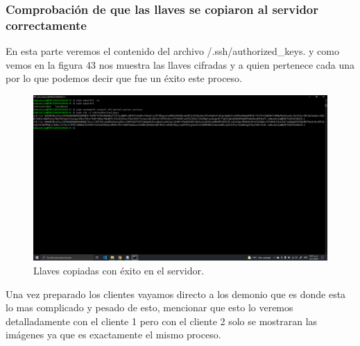 \documentclass[11pt]{article}
\begin{document}
		\subsubsection{Comprobación de que las llaves se copiaron al servidor correctamente }
		En esta parte veremos el contenido del archivo  /.ssh/authorized\_keys. y como vemos en la figura 43 nos muestra las llaves cifradas y a quien pertenece cada una por lo que podemos decir que fue un éxito este proceso.
		\begin{figure}[H]
			\centering
			\includegraphics[scale=0.34]{resources/llavesok.png}
			\caption{Llaves copiadas con éxito en el servidor.}\label{fig:picture}
		\end{figure}
		Una vez preparado los clientes vayamos directo a los demonio que es donde esta lo mas complicado y pesado de esto, mencionar que esto lo veremos detalladamente con el cliente 1 pero con el cliente 2 solo se mostraran las imágenes ya que es exactamente el mismo proceso.
\end{document}
